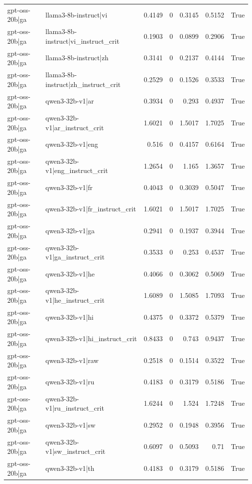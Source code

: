 \begin{table}
\begin{tabular}{l l r r r r l}
gpt-oss-20b|ga & llama3-8b-instruct|vi & 0.4149 & 0 & 0.3145 & 0.5152 & True \\
gpt-oss-20b|ga & llama3-8b-instruct|vi_instruct_crit & 0.1903 & 0 & 0.0899 & 0.2906 & True \\
gpt-oss-20b|ga & llama3-8b-instruct|zh & 0.3141 & 0 & 0.2137 & 0.4144 & True \\
gpt-oss-20b|ga & llama3-8b-instruct|zh_instruct_crit & 0.2529 & 0 & 0.1526 & 0.3533 & True \\
gpt-oss-20b|ga & qwen3-32b-v1|ar & 0.3934 & 0 & 0.293 & 0.4937 & True \\
gpt-oss-20b|ga & qwen3-32b-v1|ar_instruct_crit & 1.6021 & 0 & 1.5017 & 1.7025 & True \\
gpt-oss-20b|ga & qwen3-32b-v1|eng & 0.516 & 0 & 0.4157 & 0.6164 & True \\
gpt-oss-20b|ga & qwen3-32b-v1|eng_instruct_crit & 1.2654 & 0 & 1.165 & 1.3657 & True \\
gpt-oss-20b|ga & qwen3-32b-v1|fr & 0.4043 & 0 & 0.3039 & 0.5047 & True \\
gpt-oss-20b|ga & qwen3-32b-v1|fr_instruct_crit & 1.6021 & 0 & 1.5017 & 1.7025 & True \\
gpt-oss-20b|ga & qwen3-32b-v1|ga & 0.2941 & 0 & 0.1937 & 0.3944 & True \\
gpt-oss-20b|ga & qwen3-32b-v1|ga_instruct_crit & 0.3533 & 0 & 0.253 & 0.4537 & True \\
gpt-oss-20b|ga & qwen3-32b-v1|he & 0.4066 & 0 & 0.3062 & 0.5069 & True \\
gpt-oss-20b|ga & qwen3-32b-v1|he_instruct_crit & 1.6089 & 0 & 1.5085 & 1.7093 & True \\
gpt-oss-20b|ga & qwen3-32b-v1|hi & 0.4375 & 0 & 0.3372 & 0.5379 & True \\
gpt-oss-20b|ga & qwen3-32b-v1|hi_instruct_crit & 0.8433 & 0 & 0.743 & 0.9437 & True \\
gpt-oss-20b|ga & qwen3-32b-v1|raw & 0.2518 & 0 & 0.1514 & 0.3522 & True \\
gpt-oss-20b|ga & qwen3-32b-v1|ru & 0.4183 & 0 & 0.3179 & 0.5186 & True \\
gpt-oss-20b|ga & qwen3-32b-v1|ru_instruct_crit & 1.6244 & 0 & 1.524 & 1.7248 & True \\
gpt-oss-20b|ga & qwen3-32b-v1|sw & 0.2952 & 0 & 0.1948 & 0.3956 & True \\
gpt-oss-20b|ga & qwen3-32b-v1|sw_instruct_crit & 0.6097 & 0 & 0.5093 & 0.71 & True \\
gpt-oss-20b|ga & qwen3-32b-v1|th & 0.4183 & 0 & 0.3179 & 0.5186 & True \\

\end{tabular}
\end{table}
